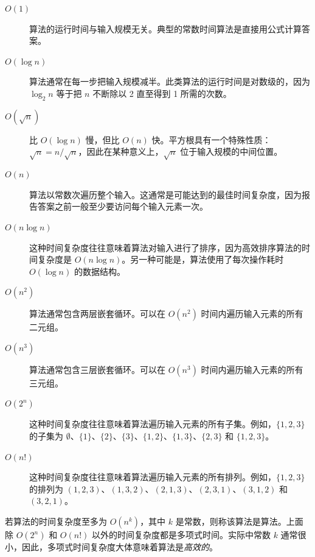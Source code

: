 \begin{description}
\item[$O(1)$]
算法的运行时间与输入规模无关。典型的常数时间算法是直接用公式计算答案。

\item[$O(\log n)$]
算法通常在每一步把输入规模减半。此类算法的运行时间是对数级的，因为 $\log_2 n$ 等于把 $n$ 不断除以 2 直至得到 1 所需的次数。

\item[$O(\sqrt n)$]
比 $O(\log n)$ 慢，但比 $O(n)$ 快。平方根具有一个特殊性质：$\sqrt n=n/\sqrt n$，因此在某种意义上，$\sqrt n$ 位于输入规模的中间位置。

\item[$O(n)$]
算法以常数次遍历整个输入。这通常是可能达到的最佳时间复杂度，因为报告答案之前一般至少要访问每个输入元素一次。

\item[$O(n \log n)$]
这种时间复杂度往往意味着算法对输入进行了排序，因为高效排序算法的时间复杂度是 $O(n \log n)$。另一种可能是，算法使用了每次操作耗时 $O(\log n)$ 的数据结构。

\item[$O(n^2)$]
算法通常包含两层嵌套循环。可以在 $O(n^2)$ 时间内遍历输入元素的所有二元组。

\item[$O(n^3)$]
算法通常包含三层嵌套循环。可以在 $O(n^3)$ 时间内遍历输入元素的所有三元组。

\item[$O(2^n)$]
这种时间复杂度往往意味着算法遍历输入元素的所有子集。例如，$\{1,2,3\}$ 的子集为 $\emptyset$、$\{1\}$、$\{2\}$、$\{3\}$、$\{1,2\}$、$\{1,3\}$、$\{2,3\}$ 和 $\{1,2,3\}$。

\item[$O(n!)$]
这种时间复杂度往往意味着算法遍历输入元素的所有排列。例如，$\{1,2,3\}$ 的排列为 $(1,2,3)$、$(1,3,2)$、$(2,1,3)$、$(2,3,1)$、$(3,1,2)$ 和 $(3,2,1)$。

\end{description}

若算法的时间复杂度至多为 $O(n^k)$，其中 $k$ 是常数，则称该算法是算法。上面除 $O(2^n)$ 和 $O(n!)$ 以外的时间复杂度都是多项式时间。实际中常数 $k$ 通常很小，因此，多项式时间复杂度大体意味着算法是\emph{高效的}。

